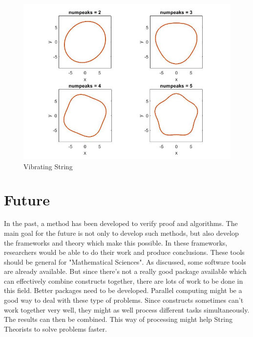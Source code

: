 \documentclass[../paper.tex]{subfiles}
\begin{document}
\begin{figure}[!htb]
\centering
\includegraphics[scale = 0.5]{Computational Problems/vibratingstring.jpg}
\caption{Vibrating String}
\label{Vibrating String}
\end{figure}

\section{Future}
In the past, a method has been developed to verify proof and algorithms. The main goal for the future is not only to develop such methods, but also develop the frameworks and theory which make this possible. In these frameworks, researchers would be able to do their work and produce conclusions. These tools should be general for "Mathematical Sciences". As discussed, some software tools are already available. But since there's not a really good package available which can effectively combine constructs together, there are lots of work to be done in this field. Better packages need to be developed. Parallel computing might be a good way to deal with these type of problems. Since constructs sometimes can't work together very well, they might as well process different tasks simultaneously. The results can then be combined. This way of processing might help String Theorists to solve problems faster.
\end{document}
